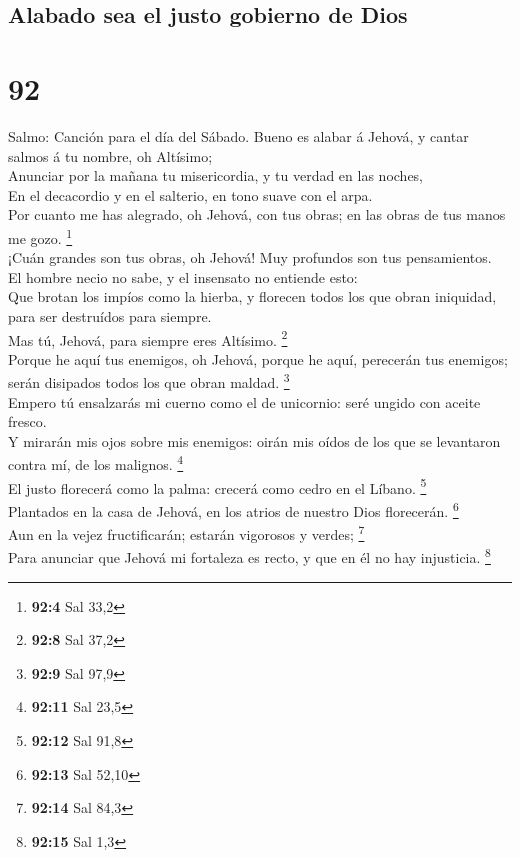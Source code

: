 \hypertarget{alabado-sea-el-justo-gobierno-de-dios}{%
\subsection{Alabado sea el justo gobierno de
Dios}\label{alabado-sea-el-justo-gobierno-de-dios}}

\hypertarget{section-91}{%
\section{92}\label{section-91}}

 Salmo: Canción para el día del Sábado. Bueno es alabar á
Jehová, y cantar salmos á tu nombre, oh Altísimo;\\
 Anunciar por la mañana tu misericordia, y tu verdad en
las noches,\\
 En el decacordio y en el salterio, en tono suave con el
arpa.\\
 Por cuanto me has alegrado, oh Jehová, con tus obras; en
las obras de tus manos me gozo. \footnote{\textbf{92:4} Sal 33,2}\\
 ¡Cuán grandes son tus obras, oh Jehová! Muy profundos son
tus pensamientos.\\
 El hombre necio no sabe, y el insensato no entiende
esto:\\
 Que brotan los impíos como la hierba, y florecen todos
los que obran iniquidad, para ser destruídos para siempre.\\
 Mas tú, Jehová, para siempre eres Altísimo. \footnote{\textbf{92:8}
  Sal 37,2}\\
 Porque he aquí tus enemigos, oh Jehová, porque he aquí,
perecerán tus enemigos; serán disipados todos los que obran maldad.
\footnote{\textbf{92:9} Sal 97,9}\\
 Empero tú ensalzarás mi cuerno como el de unicornio:
seré ungido con aceite fresco.\\
 Y mirarán mis ojos sobre mis enemigos: oirán mis oídos
de los que se levantaron contra mí, de los malignos. \footnote{\textbf{92:11}
  Sal 23,5}\\
 El justo florecerá como la palma: crecerá como cedro en
el Líbano. \footnote{\textbf{92:12} Sal 91,8}\\
 Plantados en la casa de Jehová, en los atrios de nuestro
Dios florecerán. \footnote{\textbf{92:13} Sal 52,10}\\
 Aun en la vejez fructificarán; estarán vigorosos y
verdes; \footnote{\textbf{92:14} Sal 84,3}\\
 Para anunciar que Jehová mi fortaleza es recto, y que en
él no hay injusticia. \footnote{\textbf{92:15} Sal 1,3}

